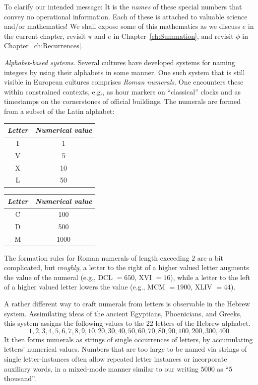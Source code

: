 To clarify our intended message: It is the {\em names} of these
special numbers that convey no operational information.  Each of these
is attached to valuable science and/or mathematics!  We shall expose
some of this mathematics as we discuss $e$ in the current chapter,
revisit $\pi$ and $e$ in Chapter~\ref{ch:Summation}, and revisit
$\phi$ in Chapter~\ref{ch:Recurrences}.

\medskip

\noindent
{\it Alphabet-based systems.} 
%
Several cultures have developed systems for naming integers by using
their alphabets in some manner.  One such system that is still visible
in European cultures comprises {\it Roman numerals}.
 One encounters these within constrained
contexts, e.g., as hour markers on ``classical'' clocks and as
timestamps on the cornerstones of official buildings.  The numerals
are formed from a subset of the Latin alphabet:

{\small
\begin{tabular}{c|c}
{\it Letter} & {\it Numerical value} \\
\hline
I  & 1 \\
V  & 5 \\
X  & 10 \\
L  & 50
\end{tabular}
\hspace*{.5in}
\begin{tabular}{c|c}
{\it Letter} & {\it Numerical value} \\
\hline
C  & 100 \\
D  & 500 \\
M  & 1000
\end{tabular}
}

\noindent
The formation rules for Roman numerals of length exceeding $2$ are a
bit complicated, but {\em roughly}, a letter to the right of a higher
valued letter augments the value of the numeral (e.g., DCL $=650$, XVI
$=16$), while a letter to the left of a higher valued letter lowers
the value (e.g., MCM $=1900$, XLIV $=44$).

A rather different way to craft numerals from letters is observable in
the Hebrew system.  Assimilating ideas of the
ancient Egyptians, Phoenicians, and Greeks, this system assigns the
following values to the $22$ letters of the Hebrew alphabet.
\[ 1, 2, 3, 4, 5, 6, 7, 8, 9, 10,
20, 30, 40, 50, 60, 70, 80, 90, 100,
 200, 300, 400
\]
It then forms numerals as strings of single occurrences of letters, by
accumulating letters' numerical values.  Numbers that are too large to
be named via strings of single letter-instances often allow repeated
letter instances or incorporate auxiliary words, in a mixed-mode
manner similar to our writing $5000$ as ``$5$ thousand''.

